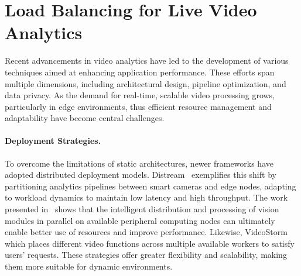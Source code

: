 \section{Load Balancing for Live Video Analytics}\label{sec:load_balancing_for_live_video_analytics}

Recent advancements in video analytics have led to the development of various techniques aimed at enhancing application performance. These efforts span multiple dimensions, including architectural design, pipeline optimization, and data privacy. As the demand for real-time, scalable video processing grows, particularly in edge environments, thus efficient resource management and adaptability have become central challenges.

\paragraph{Deployment Strategies.}
To overcome the limitations of static architectures, newer frameworks have adopted distributed deployment models. Distream~\cite{zeng2020distream} exemplifies this shift by partitioning analytics pipelines between smart cameras and edge nodes, adapting to workload dynamics to maintain low latency and high throughput. The work presented in~\cite{rachuri2021decentralized} shows that the intelligent distribution and processing of vision modules in parallel on available peripheral computing nodes can ultimately enable better use of resources and improve performance. Likewise, VideoStorm~\cite{201465videostorm} which places different video functions across multiple available workers to satisfy users' requests. These strategies offer greater flexibility and scalability, making them more suitable for dynamic environments.

